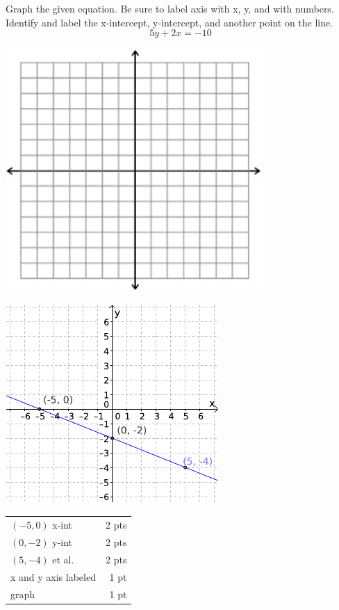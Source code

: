 {
	Graph the given equation. Be sure to label axis with x, y, and with numbers. Identify and label the x-intercept, y-intercept, and another point on the line.
	$$5y+2x=-10$$
	\begin{onlyproblem}\begin{center}\includegraphics{fig-graphpaper.png}\end{center}\end{onlyproblem}
	\begin{onlysolution}\begin{center}\includegraphics{fig095-09-b-answer}\end{center}\end{onlysolution}
}
{
	\begin{tabular}{l r}
	$(-5,0)$ x-int & 2 pts\\
	$(0,-2)$ y-int & 2 pts\\
	$(5,-4)$ et al. & 2 pts\\
	x and y axis labeled & 1 pt\\
	graph & 1 pt\\
	\end{tabular}
}


